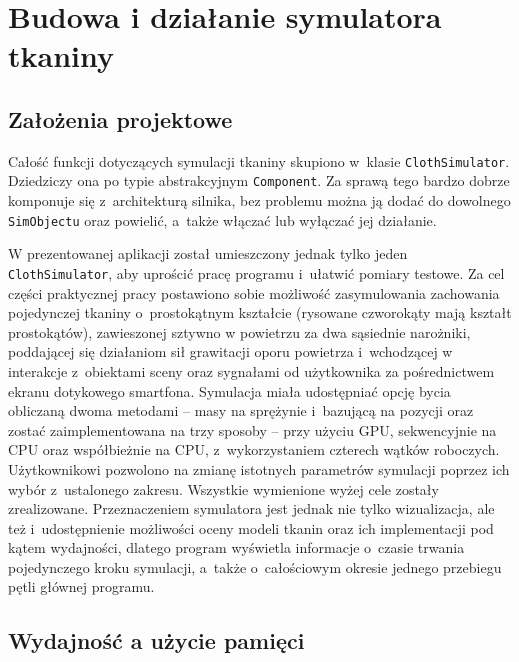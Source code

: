 \chapter{Budowa i działanie symulatora tkaniny}
\label{t:symulacja}

	\section{Założenia projektowe}
	\label{t:symulacja:zalozenia}
	
	
	Całość funkcji dotyczących symulacji tkaniny skupiono w~klasie \texttt{ClothSimulator}. Dziedziczy ona po typie abstrakcyjnym \texttt{Component}. Za sprawą tego bardzo dobrze komponuje się z~architekturą silnika, bez problemu można ją dodać do dowolnego \texttt{SimObjectu} oraz powielić, a~także włączać lub wyłączać jej działanie.
	
	W prezentowanej aplikacji został umieszczony jednak tylko jeden \texttt{ClothSimulator}, aby uprościć pracę programu i~ułatwić pomiary testowe. Za cel części praktycznej pracy postawiono sobie możliwość zasymulowania zachowania pojedynczej tkaniny o~prostokątnym kształcie (rysowane czworokąty mają kształt prostokątów), zawieszonej sztywno w powietrzu za dwa sąsiednie narożniki, poddającej się działaniom sił grawitacji oporu powietrza i~wchodzącej w interakcje z~obiektami sceny oraz sygnałami od użytkownika za pośrednictwem ekranu dotykowego smartfona. Symulacja miała udostępniać opcję bycia obliczaną dwoma metodami -- masy na sprężynie i~bazującą na pozycji oraz zostać zaimplementowana na trzy sposoby -- przy użyciu GPU, sekwencyjnie na CPU oraz współbieżnie na CPU, z~wykorzystaniem czterech wątków roboczych. Użytkownikowi pozwolono na zmianę istotnych parametrów symulacji poprzez ich wybór z~ustalonego zakresu. Wszystkie wymienione wyżej cele zostały zrealizowane. Przeznaczeniem symulatora jest jednak nie tylko wizualizacja, ale też i~udostępnienie możliwości oceny modeli tkanin oraz ich implementacji pod kątem wydajności, dlatego program wyświetla informacje o~czasie trwania pojedynczego kroku symulacji, a~także o~całościowym okresie jednego przebiegu pętli głównej programu. 
	
	\section{Wydajność a użycie pamięci}
	\label{t:symulacja:wydajnoscpamiec}
	
